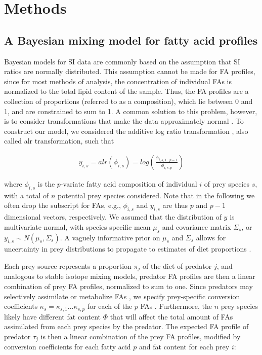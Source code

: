 \documentclass[fleqn,10pt]{wlpeerj}
\begin{document}
\section*{Methods}
\subsection*{A Bayesian mixing model for fatty acid profiles}

Bayesian models for SI data are commonly based on the assumption that
SI ratios are normally distributed. This assumption cannot be made for
FA profiles, since for most methods of analysis, the concentration of
individual FAs is normalized to the total lipid content of the
sample. Thus, the FA profiles are a collection of proportions (referred to as
a composition), which lie between 0 and 1, and are constrained to sum
to 1. A common solution to this problem, however, is to consider
transformations that make the data approximately normal
\citep{budge_studying_2006}. To construct our model, we considered the
additive log ratio transformation \citep{aitchison_convex_1999},
also called alr transformation, such that

\begin{align}
y_{i,s} = alr(\phi_{i,s}) = log \left( \frac{\phi_{i,s,1...p-1}}{\phi_{i,s,p}} \right)
\end{align}

where $\phi_{i,s}$ is the $p$-variate fatty acid composition of individual
$i$ of prey species $s$, with a total of $n$ potential prey species
considered. Note that in the following we often drop the subscript for
FAs, e.g., $\phi_{i,s}$ and $y_{i,s}$ are thus $p$ and $p-1$
dimensional vectors, respectively. We assumed that the distribution of $y$ is
multivariate normal, with species specific mean $\mu_s$ and covariance matrix $\Sigma_s$,
or $y_{i,s} \sim N(\mu_s,\Sigma_s)$. A vaguely informative prior on
$\mu_s$ and $\Sigma_s$ allows for uncertainty in prey distributions to propagate to estimates of diet proportions \citep{ward_including_2010}.

Each prey source represents a proportion $\pi_j$ of the diet of predator $j$, and
analogous to stable isotope mixing models, predator FA profiles are then a
linear combination of prey FA profiles, normalized to sum to one. Since predators may selectively assimilate or metabolize FAs
\citep{iverson_quantitative_2004,budge_studying_2006,rosen_effects_2012},
we specify prey-specific conversion coefficients $\kappa_{s}
= \kappa_{s,1}...\kappa_{s,p}$ for each of the $p$ FAs \citep{rosen_effects_2012}. Furthermore,
the $n$ prey species likely have different fat content $\Phi$
that will affect the total amount of FAs assimilated from each
prey species by the
predator. The expected FA profile of predator $\tau_j$ is then a linear combination of the prey
FA profiles, modified by conversion coefficients for each fatty acid $p$ and fat
content for each prey $i$:
\end{document}

